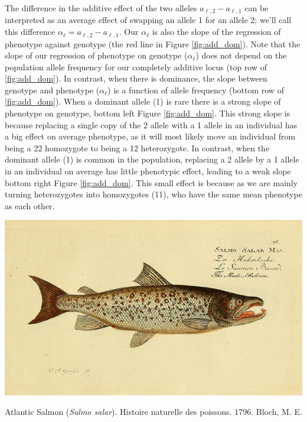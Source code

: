 The difference in the additive effect of the two alleles $a_{\ell, 2}-a_{\ell,
1}$ can be interpreted as an average effect of swapping an allele 1 for an
allele 2; we'll call this difference $\alpha_{\ell}=a_{\ell, 2}-a_{\ell, 1}$.
Our $\alpha_{\ell}$ is also the slope of the regression of phenotype against
genotype (the red line in Figure \ref{fig:add_dom}). Note that the slope of
our regression of phenotype on genotype ($\alpha_{\ell}$)  does not depend on the population
allele frequency for our completely additive locus (top row of
\ref{fig:add_dom}). In contrast, when there is dominance, the slope between
genotype and phenotype ($\alpha_{\ell}$) is a function of allele frequency
(bottom row of \ref{fig:add_dom}). When a dominant allele (1) is rare there is
a strong slope of phenotype on genotype, bottom left Figure \ref{fig:add_dom}.
This strong slope is because replacing a single copy of the 2 allele with a 1
allele in an individual has a big effect on average phenotype, as it will most
likely move an individual from being a 22 homozygote to being a 12
heterozygote. In contrast, when the dominant allele (1) is common in the
population, replacing a 2 allele by a 1 allele in an individual on average has
little phenotypic effect, leading to a weak slope bottom right Figure \ref{fig:add_dom}. This small effect is because as we are mainly turning
heterozygotes into homozygotes (11), who have the same mean phenotype as each other.  \\


\begin{marginfigure}
\begin{center}
\includegraphics[width=\textwidth]{illustration_images/Quant_gen/Salmon/6918368208_5353868a88_z.jpg}
\end{center}
\caption{Atlantic Salmon ({\it Salmo salar}). Histoire naturelle des poissons. 1796. Bloch, M. E.} \label{fig:Salmon}
\end{marginfigure}


